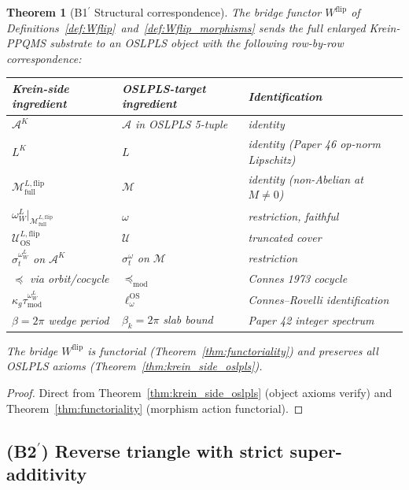 \documentclass[11pt,a4paper]{article}
\theoremstyle{plain}
\newtheorem{theorem}{Theorem}[section]
\theoremstyle{definition}
\newcommand{\Acal}{\mathcal{A}}
\newcommand{\Mcal}{\mathcal{M}}
\newcommand{\Ucal}{\mathcal{U}}
\newcommand{\BWvac}{\omega_{W}^{L}}
\newcommand{\tmod}{\tau_{\mathrm{mod}}}
\newcommand{\kappag}{\kappa_{g}}
\newcommand{\ellOS}{\ell^{\mathrm{OS}}}
\newcommand{\Mflipfull}{\Mcal^{L,\mathrm{flip}}_{\mathrm{full}}}
\newcommand{\Wflip}{W^{\mathrm{flip}}}
\begin{document}
\begin{theorem}[B1$^{\prime}$ Structural correspondence]
\label{thm:b1prime}
The bridge functor $\Wflip$ of
Definitions~\ref{def:Wflip}~and~\ref{def:Wflip_morphisms} sends the
full enlarged Krein-PPQMS substrate to an OSLPLS object with the
following row-by-row correspondence:

\begin{center}
\begin{tabular}{lll}
\toprule
Krein-side ingredient & OSLPLS-target ingredient & Identification \\
\midrule
$\Acal^{K}$ & $\Acal$ in OSLPLS 5-tuple & identity \\
$L^{K}$ & $L$ & identity (Paper 46 op-norm Lipschitz) \\
$\Mflipfull$ & $\Mcal$ & identity (non-Abelian at $M\ne 0$) \\
$\BWvac|_{\Mflipfull}$ & $\omega$ & restriction, faithful \\
$\Ucal^{L,\mathrm{flip}}_{\mathrm{OS}}$ & $\Ucal$ & truncated cover \\
$\sigma_{t}^{\BWvac}$ on $\Acal^{K}$ & $\sigma_{t}^{\omega}$ on $\Mcal$ & restriction \\
$\preceq$ via orbit/cocycle & $\preceq_{\mathrm{mod}}$ & Connes 1973 cocycle \\
$\kappag\tmod^{\BWvac}$ & $\ellOS_{\omega}$ & Connes--Rovelli identification \\
$\beta=2\pi$ wedge period & $\beta_{k}=2\pi$ slab bound & Paper 42 integer spectrum \\
\bottomrule
\end{tabular}
\end{center}

The bridge $\Wflip$ is functorial (Theorem~\ref{thm:functoriality})
and preserves all OSLPLS axioms (Theorem~\ref{thm:krein_side_oslpls}).
\end{theorem}

\begin{proof}
Direct from Theorem~\ref{thm:krein_side_oslpls} (object axioms verify)
and Theorem~\ref{thm:functoriality} (morphism action functorial).
\end{proof}

\subsection{(B2$^{\prime}$) Reverse triangle with strict
super-additivity}\label{sec:b2prime}
\end{document}
